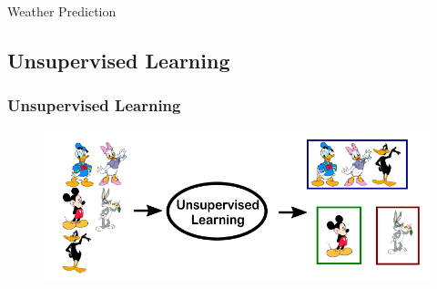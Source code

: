 \documentclass[9pt]{beamer}
\begin{document}
\begin{CJK*}{GBK}{kai}
\begin{frame}
\begin{block}{Weather Prediction}
\begin{figure}[h]
		\end{figure}
	\end{block}
\end{frame}
\subsection{Unsupervised Learning}
\begin{frame}
\frametitle{Unsupervised Learning}
\begin{figure}[h]
	\centering
	\includegraphics[scale=0.3]{unsupervisedlearning.png}
	

\end{figure}
\end{frame}
\end{CJK*}
\end{document}
